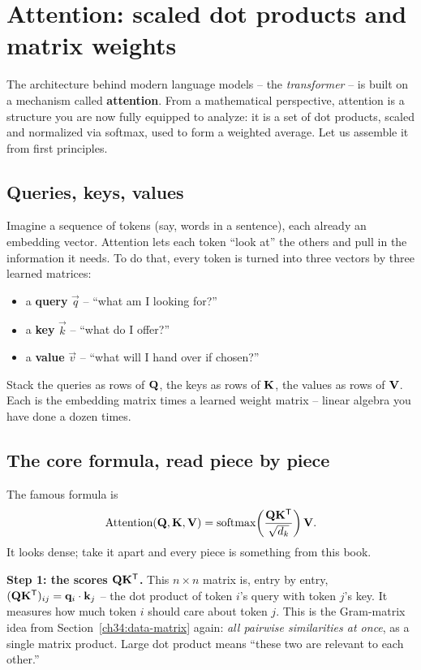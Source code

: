 \section{Attention: scaled dot products and matrix weights}
\label{ch34:attention}

The architecture behind modern language models -- the \emph{transformer} --
is built on a mechanism called \textbf{attention}. From a mathematical perspective, attention
is a structure you are now fully equipped to analyze: it is a set of dot products, scaled and
normalized via softmax, used to form a weighted average. Let us assemble it from first principles.

\subsection{Queries, keys, values}

Imagine a sequence of tokens (say, words in a sentence), each already an embedding vector.
Attention lets each token ``look at'' the others and pull in the information it needs. To
do that, every token is turned into three vectors by three learned matrices:
\begin{itemize}
  \item a \textbf{query} $\vec{q}$ -- ``what am I looking for?''
  \item a \textbf{key} $\vec{k}$ -- ``what do I offer?''
  \item a \textbf{value} $\vec{v}$ -- ``what will I hand over if chosen?''
\end{itemize}
Stack the queries as rows of $\mathbf{Q}$, the keys as rows of $\mathbf{K}$, the values as rows
of $\mathbf{V}$. Each is the embedding matrix times a learned weight matrix -- linear
algebra you have done a dozen times.

\subsection{The core formula, read piece by piece}

The famous formula is
\[
\text{Attention}(\mathbf{Q},\mathbf{K},\mathbf{V}) =
\text{softmax}\!\left(\frac{\mathbf{Q}\mathbf{K}^{\mathsf{T}}}{\sqrt{d_k}}\right)\mathbf{V}.
\]
It looks dense; take it apart and every piece is something from this book.

\textbf{Step 1: the scores $\mathbf{Q}\mathbf{K}^{\mathsf{T}}$.} This $n\times n$ matrix is, entry by entry,
$(\mathbf{Q}\mathbf{K}^{\mathsf{T}})_{ij} = \mathbf{q}_i \cdot \mathbf{k}_j$ -- the dot product of token $i$'s
query with token $j$'s key. It measures how much token $i$ should care about token $j$.
This is the Gram-matrix idea from Section~\ref{ch34:data-matrix} again: \emph{all pairwise
similarities at once}, as a single matrix product. Large dot product means ``these two are
relevant to each other.''

